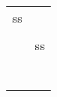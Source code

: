 \documentclass[class=article, crop=false]{standalone}
\begin{document}
    \begin{table}[]
        \begin{tabular}{ll}
          ss  &  \\
            &  \\
            & ss \\
            &  \\
            &  \\
            &  \\
            &  \\
            &  \\
            &  \\
            &
        \end{tabular}
    \end{table}
\end{document}
